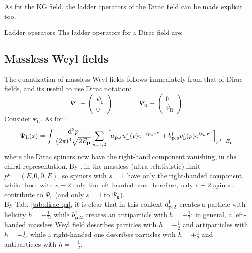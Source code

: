 As for the KG field, the ladder operators of the Dirac field can be made explicit too.

\begin{proposition}{Ladder operators}{}
  The ladder operators for a Dirac field are:
\end{proposition}

\subsection{Massless Weyl fields}

The quantization of massless Weyl fields follows immediately from that of Dirac fields, and its useful to use Dirac notation:
\begin{equation*}
  \Psi_\text{L} \equiv
  \begin{pmatrix}
    \psi_\text{L} \\ 0
  \end{pmatrix}
  \qquad \qquad
  \Psi_\text{R} \equiv
  \begin{pmatrix}
    0 \\ \psi_\text{R}
  \end{pmatrix}
\end{equation*}
Consider $ \Psi_\text{L} $. As for :
\begin{equation*}
  \Psi_\text{L}(x) = \int \frac{\mathrm{d}^3p}{(2\pi)^3 \sqrt{2E_{\mathbf{p}}}} \sum_{s = 1,2} \left[ a_{\mathbf{p},s} u_\text{L}^s(p) e^{-i p_\mu x^\mu} + b_{\mathbf{p},s}^\dagger v_\text{L}^s(p) e^{i p_\mu x^\mu} \right]_{p^0 = E_{\mathbf{p}}}
\end{equation*}
where the Dirac spinors now have the right-hand component vanishing, in the chiral representation. By , in the massless (ultra-relativistic) limit $ p^\mu = (E,0,0,E) $, so spinors with $ s = 1 $ have only the right-handed component, while those with $ s = 2 $ only the left-handed one: therefore, only $ s = 2 $ spinors contribute to $ \Psi_\text{L} $ (and only $ s = 1 $ to $ \Psi_\text{R} $).\\
By Tab. \ref{tab:dirac-qn}, it is clear that in this context $ a_{\mathbf{p},2}^\dagger $ creates a particle with helicity $ h = - \frac{1}{2} $, while $ b_{\mathbf{p},2}^\dagger $ creates an antiparticle with $ h = + \frac{1}{2} $: in general, a left-handed massless Weyl field describes particles with $ h = - \frac{1}{2} $ and antiparticles with $ h = + \frac{1}{2} $, while a right-handed one describes particles with $ h = + \frac{1}{2} $ and antiparticles with $ h = - \frac{1}{2} $.

